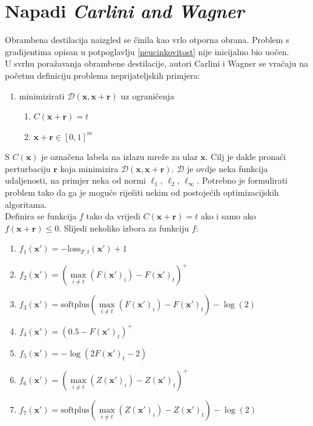 \documentclass[utf8, diplomski]{fer}
\begin{document}
\section{Napadi \textit{Carlini and Wagner}}\label{cw}
Obrambena destilacija naizgled se činila kao vrlo otporna obrana. Problem s gradijentima opisan u potpoglavlju \ref{neucinkovitost} nije inicijalno bio uočen. \\
U svrhu poražavanja obrambene destilacije, autori Carlini i Wagner se vraćaju na početnu definiciju problema neprijateljskih primjera\citep{Carlini2017TowardsET}: 
\begin{enumerate}[noitemsep, label=\textbullet]
  \item minimizirati $\mathcal{D}(\boldsymbol{x}, \boldsymbol{x} + \boldsymbol{r})$ uz ograničenja
  \begin{enumerate}
  \item $C(\boldsymbol{x}+\boldsymbol{r}) = t$
  \item $\boldsymbol{x} + \boldsymbol{r} \in [0, 1]^{m}$
  \end{enumerate}
\end{enumerate}
S $C(\boldsymbol{x})$ je označena labela na izlazu mreže za ulaz $\boldsymbol{x}$. Cilj je dakle pronaći perturbaciju $\boldsymbol{r}$ koja minimizira $\mathcal{D}(\boldsymbol{x}, \boldsymbol{x} + \boldsymbol{r})$. $\mathcal{D}$ je ovdje neka funkcija udaljenosti, na primjer neka od normi $\ell_{1}$, $\ell_{2}$, $\ell_{\infty}$. Potrebno je formulirati problem tako da ga je moguće riješiti nekim od postojećih optimizacijskih algoritama. \\
Definira se funkcija $f$ tako da vrijedi $C(\boldsymbol{x}+\boldsymbol{r}) = t$ ako i samo ako $f(\boldsymbol{x} + \boldsymbol{r}) \leq 0$. Slijedi nekoliko izbora za funkciju $f$:
\begin{enumerate}[topsep=0pt,parsep=0pt,partopsep=0pt, label={}]
	\item $f_{1}(\boldsymbol{x}') = -\text{loss}_{F,t}(\boldsymbol{x}') + 1$
    \item $f_{2}(\boldsymbol{x}') = (\underset{i \neq t}{\max}(F(\boldsymbol{x}')_{i}) - F(\boldsymbol{x}')_{t})^{+}$
    \item $f_{3}(\boldsymbol{x}') = \text{softplus}(\underset{i \neq t}{\max}(F(\boldsymbol{x}')_{i}) - F(\boldsymbol{x}')_{t}) - \log(2)$
    \item $f_{4}(\boldsymbol{x}') = (0.5 - F(\boldsymbol{x}')_{t})^{+}$
    \item $f_{5}(\boldsymbol{x}') = -\log(2F(\boldsymbol{x}')_{t} - 2)$
    \item $f_{6}(\boldsymbol{x}') = (\underset{i \neq t}{\max}(Z(\boldsymbol{x}')_{i}) - Z(\boldsymbol{x}')_{t})^{+}$
    \item $f_{7}(\boldsymbol{x}') = \text{softplus}(\underset{i \neq t}{\max}(Z(\boldsymbol{x}')_{i}) - Z(\boldsymbol{x}')_{t}) - \log(2)$
\end{enumerate}
\end{document}

